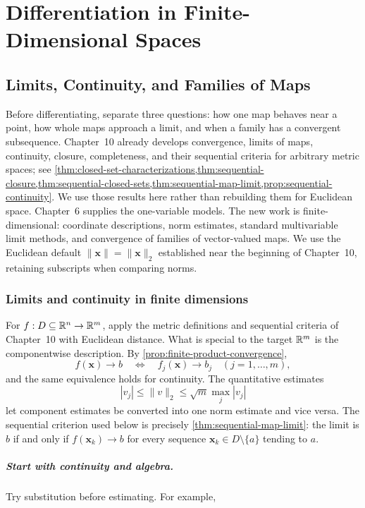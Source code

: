 \chapter{Differentiation in Finite-Dimensional Spaces}
\label{ch:multivariable-differentiation}

\section{Limits, Continuity, and Families of Maps}
\label{sec:finite-map-limits}
Before differentiating, separate three questions: how one map behaves near
a point, how whole maps approach a limit, and when a family has a convergent
subsequence. Chapter~10 already develops convergence, limits of maps,
continuity, closure, completeness, and their sequential criteria for arbitrary
metric spaces; see
\cref{thm:closed-set-characterizations,thm:sequential-closure,thm:sequential-closed-sets,thm:sequential-map-limit,prop:sequential-continuity}.
We use those results here rather than rebuilding
them for Euclidean space. Chapter~6 supplies the one-variable models.
The new work is finite-dimensional: coordinate descriptions, norm estimates,
standard multivariable limit methods, and convergence of families of
vector-valued maps. We use the Euclidean default $\|\mathbf{x}\|=\|\mathbf{x}\|_2$ established
near the beginning of Chapter~10, retaining subscripts when comparing norms.

\subsection{Limits and continuity in finite dimensions}
For $f:D\subseteq\mathbb{R}^n\to\mathbb{R}^m$, apply the metric definitions and sequential
criteria of Chapter~10 with Euclidean distance. What is special to the target
$\mathbb{R}^m$ is the componentwise description. By
\cref{prop:finite-product-convergence},
\[
f(\mathbf{x})\to b\quad\Longleftrightarrow\quad f_j(\mathbf{x})\to b_j
\quad(j=1,\ldots,m),
\]
and the same equivalence holds for continuity. The quantitative estimates
\[
|v_j|\leq\|v\|_2\leq\sqrt m\max_j|v_j|
\]
let component estimates be converted into one norm estimate and vice versa.
The sequential criterion used below is precisely
\cref{thm:sequential-map-limit}: the limit is $b$ if and only if
$f(\mathbf{x}_k)\to b$ for every sequence
$\mathbf{x}_k\in D\setminus\{a\}$ tending to $a$.

\paragraph{Start with continuity and algebra.}
Try substitution before estimating. For example,

